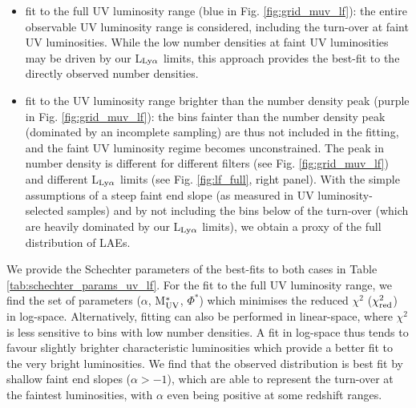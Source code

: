 \documentclass[a4paper,fleqn,usenatbib]{mnras}
\begin{document}
\begin{itemize}
\item fit to the full UV luminosity range (blue in Fig. \ref{fig:grid_muv_lf}): the entire observable UV luminosity range is considered, including the turn-over at faint UV luminosities. While the low number densities at faint UV luminosities may be driven by our L$_{\rm Ly\alpha}$ limits, this approach provides the best-fit to the directly observed number densities.
\item fit to the UV luminosity range brighter than the number density peak (purple in Fig. \ref{fig:grid_muv_lf}): the bins fainter than the number density peak (dominated by an incomplete sampling) are thus not included in the fitting, and the faint UV luminosity regime becomes unconstrained. The peak in number density is different for different filters (see Fig. \ref{fig:grid_muv_lf}) and different L$_{\rm Ly\alpha}$ limits (see Fig. \ref{fig:lf_full}, right panel). With the simple assumptions of a steep faint end slope (as measured in UV luminosity-selected samples) and by not including the bins below of the turn-over (which are heavily dominated by our L$_{\rm Ly\alpha}$ limits), we obtain a proxy of the full distribution of LAEs.
\end{itemize}


We provide the Schechter parameters of the best-fits to both cases in Table \ref{tab:schechter_params_uv_lf}. For the fit to the full UV luminosity range, we find the set of parameters ($\alpha$, M$_{\rm UV}^*$, $\Phi^*$) which minimises the reduced $\chi^2$ ($\chi^2_{\rm red}$) in log-space. Alternatively, fitting can also be performed in linear-space, where $\chi^2$ is less sensitive to bins with low number densities. A fit in log-space thus tends to favour slightly brighter characteristic luminosities which provide a better fit to the very bright luminosities. We find that the observed distribution is best fit by shallow faint end slopes ($\alpha>-1$), which are able to represent the turn-over at the faintest luminosities, with $\alpha$ even being positive at some redshift ranges.
\end{document}
